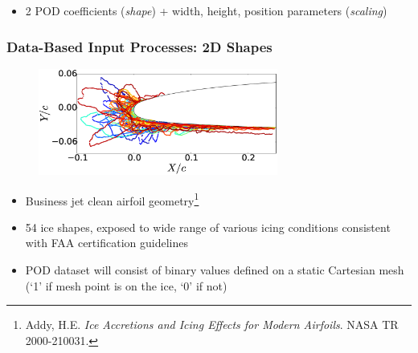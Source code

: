 \documentclass[9pt]{beamer}
\begin{document}
\begin{frame}
\begin{itemize}
\item 2 POD coefficients (\emph{shape}) + width, height, position parameters (\emph{scaling})
\end{itemize}
\end{frame}
\begin{frame}
\frametitle{Data-Based Input Processes: 2D Shapes}
\label{sec-3-5}


\begin{figure}
  \centering
  \includegraphics[width=0.7\textwidth]{Dataset}
\end{figure}

\begin{itemize}
\item Business jet clean airfoil geometry\footnote{Addy, H.E. \emph{Ice Accretions and Icing Effects for Modern Airfoils}. NASA TR 2000-210031.
 }
\item 54 ice shapes, exposed to wide range of various icing conditions
  consistent with FAA certification guidelines
\item POD dataset will consist of binary values defined on a static
  Cartesian mesh (`1' if mesh point is on the ice, `0' if not)
\end{itemize}
\end{frame}
\end{document}
